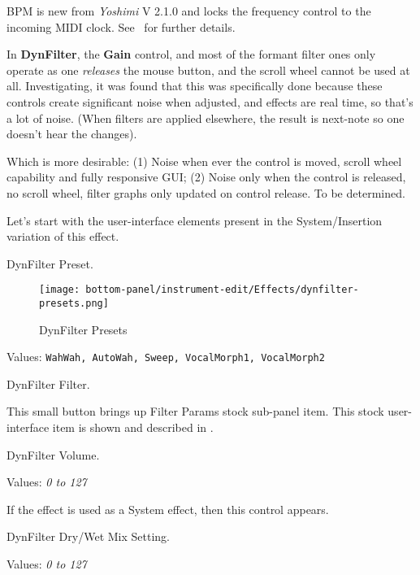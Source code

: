    BPM is new from \textsl{Yoshimi} V 2.1.0 and locks the frequency control to the
   incoming MIDI clock. See \ for further details.

   In \textbf{DynFilter}, the \textbf{Gain} control, and most of the formant
   filter ones only operate as one \textsl{releases} the mouse button, and the
   scroll wheel cannot be used at all.  Investigating, it was found that this
   was specifically done because these controls create significant noise when
   adjusted, and effects are real time, so that's a lot of noise. (When filters
   are applied elsewhere, the result is next-note so one doesn't hear the
   changes).

   Which is more desirable:
   (1) Noise when ever the control is moved, scroll wheel capability and fully
   responsive GUI;
   (2) Noise only when the control is released, no scroll wheel, filter graphs
   only updated on control release.
   To be determined.

   Let's start with the user-interface elements present in the
   System/Insertion variation of this effect.

   \setcounter{ItemCounter}{0}      %

   DynFilter Preset.

\begin{figure}[H]
   \centering
   \texttt{[image: bottom-panel/instrument-edit/Effects/dynfilter-presets.png]}
   \caption{DynFilter Presets}
   \label{fig:effects_dynfilter_presets}
\end{figure}

   Values: \texttt{WahWah, AutoWah, Sweep, VocalMorph1, VocalMorph2}

   DynFilter Filter.

   This small button brings up Filter Params stock sub-panel item.
   This stock user-interface item is shown and described in
   .

   DynFilter Volume.

   Values: \textsl{0 to 127}

   If the effect is used as a System effect, then this control appears.

   DynFilter Dry/Wet Mix Setting.

   Values: \textsl{0 to 127}

